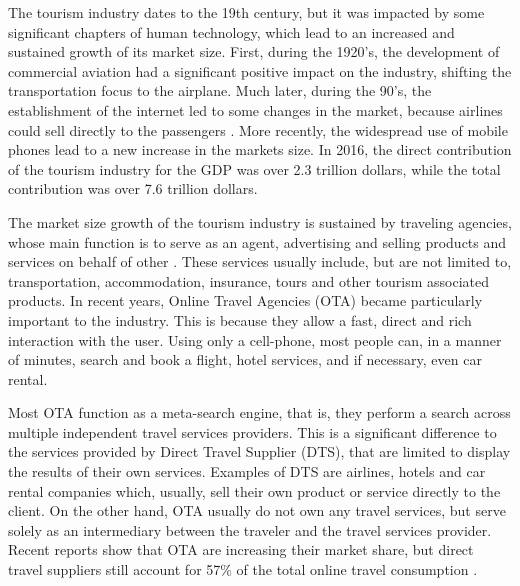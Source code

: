 The tourism industry dates to the 19th century, but it was impacted by some significant chapters of human technology, which lead to an increased and sustained growth of its market size. First, during the 1920's, the development of commercial aviation had a significant positive impact on the industry, shifting the transportation focus to the airplane. Much later, during the 90's, the establishment of the internet led to some changes in the market, because airlines could sell directly to the passengers \cite{tourism_tec}. More recently, the widespread use of mobile phones lead to a new increase in the markets size. In 2016, the direct contribution of the tourism industry for the GDP was over 2.3 trillion dollars, while the total contribution was over 7.6 trillion dollars\cite{travel_report}.

The market size growth of the tourism industry is sustained by traveling agencies, whose main function is to serve as an agent, advertising and selling products and services on behalf of other \cite{book_tourism}. These services usually include, but are not limited to, transportation, accommodation, insurance, tours and other tourism associated products. In recent years, Online Travel Agencies (OTA) became particularly important to the industry. This is because they allow a fast, direct and rich interaction with the user. Using only a cell-phone, most people can, in a manner of minutes, search and book a flight, hotel services, and if necessary, even car rental. 
   
Most OTA function as a meta-search engine, that is, they perform a search across multiple independent travel services providers. This is a significant difference to the services provided by Direct Travel Supplier (DTS), that are limited to display the results of their own services. Examples of DTS are airlines, hotels and car rental companies which, usually, sell their own product or service directly to the client. On the other hand, OTA usually do not own any travel services, but serve solely as an intermediary between the traveler and the travel services provider. Recent reports show that OTA are increasing their market share, but direct travel suppliers still account for 57\% of the total online travel consumption \cite{OTA_industry_report}.

